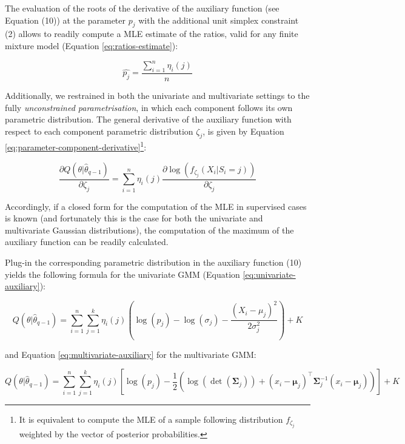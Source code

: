 The evaluation of the roots of the derivative of the auxiliary function
(see Equation (10)) at the parameter \(p_j\) with the additional unit simplex constraint (2) allows to readily compute a MLE estimate of the ratios, valid for any finite mixture model (Equation \eqref{eq:ratios-estimate}):

\begin{equation}
\hat{p_j}= \frac{\sum_{i=1}^n \eta_{i}(j)}{n}
\label{eq:ratios-estimate}
\end{equation}

Additionally, we restrained in both the univariate and
multivariate settings to the fully \emph{unconstrained parametrisation}, in which each component follows its own parametric distribution. The general
derivative of the auxiliary function with respect to each
component parametric distribution \(\zeta_j\), is given by Equation
\eqref{eq:parameter-component-derivative}\footnote{It is equivalent to compute the MLE of a sample following distribution \(f_{\zeta_j}\) weighted by the vector of posterior probabilities.}:

\begin{equation}
\frac{\partial Q(\theta|\hat{\theta}_{q-1})}{\partial \zeta_j}=\sum_{i=1}^n  \eta_{i}(j) \frac{\partial \log (f_{\zeta_j}(X_i|S_i=j))}{\partial \zeta_j}
\label{eq:parameter-component-derivative}
\end{equation}

Accordingly, if a closed form for the computation of the MLE in
supervised cases is known (and fortunately this is the case for both the univariate and multivariate Gaussian distributions), the computation of the maximum of the auxiliary function can be readily calculated.

Plug-in the corresponding parametric distribution in the auxiliary function (10) yields the following formula for the univariate GMM (Equation
\eqref{eq:univariate-auxiliary}):

\begin{equation}
Q(\theta| \hat{\theta}_{q-1}) = \sum_{i=1}^n \sum_{j=1}^k \eta_i(j) \left( \log (p_j) - \log (\sigma_j) - \frac{(X_i-\mu_j)^2}{2\sigma_j^2} \right) + K
\label{eq:univariate-auxiliary}
\end{equation}

and Equation \eqref{eq:multivariate-auxiliary} for the multivariate GMM:

\begin{equation}
Q(\theta| \hat{\theta}_{q-1}) = \sum_{i=1}^n \sum_{j=1}^k \eta_i(j) \left[ \log (p_j) - \frac{1}{2} \left( \log(\operatorname{det}(\boldsymbol{\Sigma}_j)) + (x_i - \boldsymbol{\mu}_j)^\top \boldsymbol{\Sigma}_j^{-1}(x_i - \boldsymbol{\mu}_j)\right) \right] + K
\label{eq:multivariate-auxiliary}
\end{equation}

